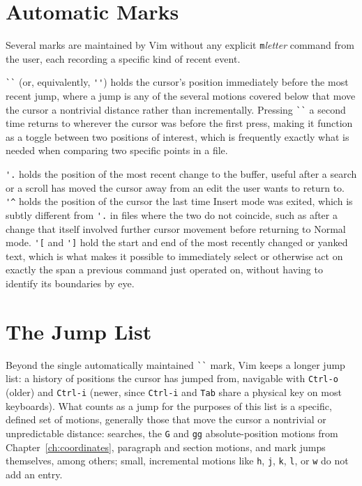 \section{Automatic Marks}

Several marks are maintained by Vim without any explicit \texttt{m}\textit{letter} command from the user, each recording a specific kind of recent event.

\verb|``| (or, equivalently, \verb|''|) holds the cursor's position immediately before the most recent jump, where a jump is any of the several motions covered below that move the cursor a nontrivial distance rather than incrementally. Pressing \verb|``| a second time returns to wherever the cursor was before the first press, making it function as a toggle between two positions of interest, which is frequently exactly what is needed when comparing two specific points in a file.

\verb|'.| holds the position of the most recent change to the buffer, useful after a search or a scroll has moved the cursor away from an edit the user wants to return to. \verb|'^| holds the position of the cursor the last time Insert mode was exited, which is subtly different from \verb|'.| in files where the two do not coincide, such as after a change that itself involved further cursor movement before returning to Normal mode. \verb|'[| and \verb|']| hold the start and end of the most recently changed or yanked text, which is what makes it possible to immediately select or otherwise act on exactly the span a previous command just operated on, without having to identify its boundaries by eye.

\section{The Jump List}

Beyond the single automatically maintained \verb|``| mark, Vim keeps a longer jump list: a history of positions the cursor has jumped from, navigable with \texttt{Ctrl-o} (older) and \texttt{Ctrl-i} (newer, since \texttt{Ctrl-i} and \texttt{Tab} share a physical key on most keyboards). What counts as a jump for the purposes of this list is a specific, defined set of motions, generally those that move the cursor a nontrivial or unpredictable distance: searches, the \texttt{G} and \texttt{gg} absolute-position motions from Chapter~\ref{ch:coordinates}, paragraph and section motions, and mark jumps themselves, among others; small, incremental motions like \texttt{h}, \texttt{j}, \texttt{k}, \texttt{l}, or \texttt{w} do not add an entry.

